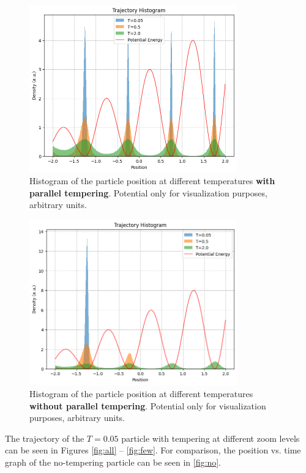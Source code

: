 \documentclass[11pt]{article}
\begin{document}
\begin{figure}[p]
	\centering
	\includegraphics[width = 0.8\textwidth]{histogram_yes.png}
	\caption{Histogram of the particle position at different temperatures \textbf{with parallel tempering}. Potential only for visualization purposes, arbitrary units.}
	\label{fig:with}
\end{figure}
\begin{figure}[p]
	\centering
	\includegraphics[width = 0.8\textwidth]{histogram_no.png}
	\caption{Histogram of the particle position at different temperatures \textbf{without parallel tempering}. Potential only for visualization purposes, arbitrary units.}
	\label{fig:without}
\end{figure}


The trajectory of the $T = 0.05$ particle with tempering at different zoom levels can be seen in Figures \ref{fig:all} -- \ref{fig:few}.
For comparison, the position vs. time graph of the no-tempering particle can be seen in \autoref{fig:no}.
\end{document}
